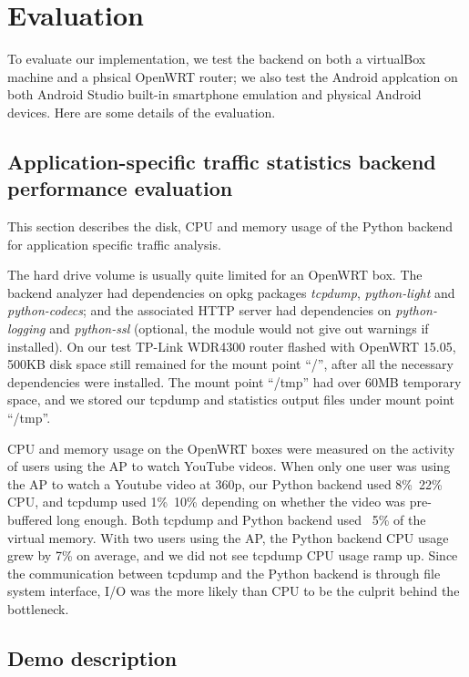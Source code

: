\section{Evaluation}
To evaluate our implementation, we test the backend on both a virtualBox machine and a phsical OpenWRT router; we also test the Android applcation on both Android Studio built-in smartphone emulation and physical Android devices. Here are some details of the evaluation.

\subsection{Application-specific traffic statistics backend performance evaluation}

This section describes the disk, CPU and memory usage of the Python backend for application specific traffic analysis. 

The hard drive volume is usually quite limited for an OpenWRT box. The backend analyzer had dependencies on opkg packages \textit{tcpdump}, \textit{python-light} and \textit{python-codecs}; and the associated HTTP server had dependencies on \textit{python-logging} and \textit{python-ssl} (optional, the module would not give out warnings if installed). On our test TP-Link WDR4300 router flashed with OpenWRT 15.05, 500KB disk space still remained for the mount point ``/'', after all the necessary dependencies were installed. The mount point ``/tmp'' had over 60MB temporary space, and we stored our tcpdump and statistics output files under mount point ``/tmp''.

CPU and memory usage on the OpenWRT boxes were measured on the activity of users using the AP to watch YouTube videos. When only one user was using the AP to watch a Youtube video at 360p, our Python backend used 8\%~22\% CPU, and tcpdump used 1\%~10\% depending on whether the video was pre-buffered long enough. Both tcpdump and Python backend used ~5\% of the virtual memory. With two users using the AP, the Python backend CPU usage grew by 7\% on average, and we did not see tcpdump CPU usage ramp up. Since the communication between tcpdump and the Python backend is through file system interface, I/O was the more likely than CPU to be the culprit behind the bottleneck.

\subsection{Demo description}

